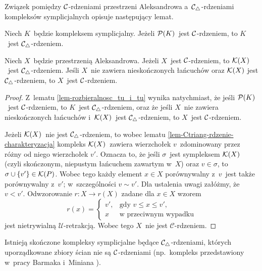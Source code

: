Związek pomiędzy $\mathcal{C}$-rdzeniami przestrzeni Aleksandrowa a~$\mathcal{C}_\triangle$-rdzeniami kompleksów symplicjalnych opisuje następujący lemat.
\begin{lem}\label{lem-strong_collapsible_to_strong_collapsible}
Niech $K$~będzie kompleksem symplicjalny. Jeżeli $\mathcal{P}(K)$~jest $\mathcal{C}$-rdzeniem, to $K$~jest $\mathcal{C}_\triangle$-rdzeniem.

Niech $X$~będzie przestrzenią Aleksandrowa. Jeżeli $X$~jest \mbox{$\mathcal{C}$-rdzeniem}, to $\mathcal{K}(X)$~jest $\mathcal{C}_\triangle$-rdzeniem. Jeśli $X$~nie zawiera nieskończonych łańcuchów oraz $\mathcal{K}(X)$ jest \mbox{$\mathcal{C}_\triangle$-rdzeniem}, to $X$~jest $\mathcal{C}$-rdzeniem.
\end{lem}
\begin{proof}
Z~lematu \ref{lem-rozbieralnosc_tu_i_tu} wynika natychmiast, że jeśli $\mathcal{P}(K)$~jest $\mathcal{C}$-rdzeniem, to $K$~jest $\mathcal{C}_\triangle$-rdzeniem, oraz że jeśli $X$~nie zawiera nieskończonych łańcuchów i~$\mathcal{K}(X)$~jest $\mathcal{C}_\triangle$-rdzeniem, to $X$~jest $\mathcal{C}$-rdzeniem.

Jeżeli $\mathcal{K}(X)$~nie jest $\mathcal{C}_\triangle$-rdzeniem, to wobec lematu \ref{lem-Ctriang-rdzenie-charakteryzacja} kompleks $\mathcal{K}(X)$~zawiera wierzchołek $v$~zdominowany przez różny od niego wierzchołek $v'$. Oznacza to, że jeśli $\sigma$~jest sympleksem $\mathcal{K}(X)$ (czyli skończonym, niepustym łańcuchem zawartym w~$X$) oraz $v\in\sigma$, to $\sigma\cup\left\{v'\right\}\in\mathcal{K}(P)$. Wobec tego każdy element $x\in X$ porównywalny z~$v$~jest także porównywalny z~$v'$; w~szczególności $v\sim v'$. Dla ustalenia uwagi załóżmy, że $v< v'$. Odwzorowanie $r\colon X\to r(X)$ zadane dla $x\in X$ wzorem \[r(x)=\begin{cases}v', &\text{gdy } v\leq x\leq v',\\ x&\text{w przeciwnym wypadku}\end{cases}\] jest nietrywialną $\mathcal{U}$-retrakcją. Wobec tego $X$~nie jest $\mathcal{C}$-rdzeniem.
\end{proof}
Istnieją skończone kompleksy symplicjalne będące \mbox{$\mathcal{C}_\triangle$-rdzeniami}, których uporządkowane zbiory ścian nie są \mbox{$\mathcal{C}$-rdzeniami} (np.~kompleks przedstawiony w~pracy Barmaka i~Miniana \cite[Example 2.13]{Barmak12}).






